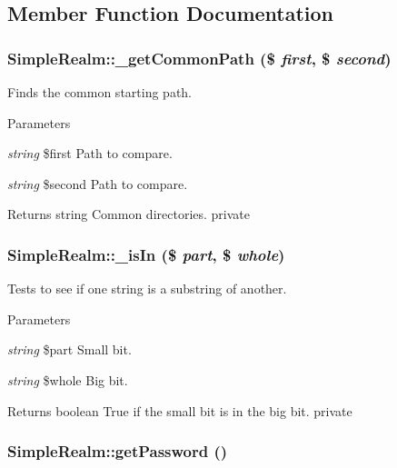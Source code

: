 \subsection{Member Function Documentation}
\hypertarget{class_simple_realm_aaa3d4109ef5eaa54f04d8e3c213ce88f}{
\subsubsection[{\_\-getCommonPath}]{\setlength{\rightskip}{0pt plus 5cm}SimpleRealm::\_\-getCommonPath (\$ {\em first}, \/  \$ {\em second})}}
\label{class_simple_realm_aaa3d4109ef5eaa54f04d8e3c213ce88f}
Finds the common starting path. 
\begin{DoxyParams}{Parameters}
\item[{\em string}]\$first Path to compare. \item[{\em string}]\$second Path to compare. \end{DoxyParams}
\begin{DoxyReturn}{Returns}
string Common directories.  private 
\end{DoxyReturn}
\hypertarget{class_simple_realm_a31fe2a65a1da7590b51f9139f8195ab7}{
\subsubsection[{\_\-isIn}]{\setlength{\rightskip}{0pt plus 5cm}SimpleRealm::\_\-isIn (\$ {\em part}, \/  \$ {\em whole})}}
\label{class_simple_realm_a31fe2a65a1da7590b51f9139f8195ab7}
Tests to see if one string is a substring of another. 
\begin{DoxyParams}{Parameters}
\item[{\em string}]\$part Small bit. \item[{\em string}]\$whole Big bit. \end{DoxyParams}
\begin{DoxyReturn}{Returns}
boolean True if the small bit is in the big bit.  private 
\end{DoxyReturn}
\hypertarget{class_simple_realm_a983a28e44171457f617582d877b94ea8}{
\subsubsection[{getPassword}]{\setlength{\rightskip}{0pt plus 5cm}SimpleRealm::getPassword ()}}
